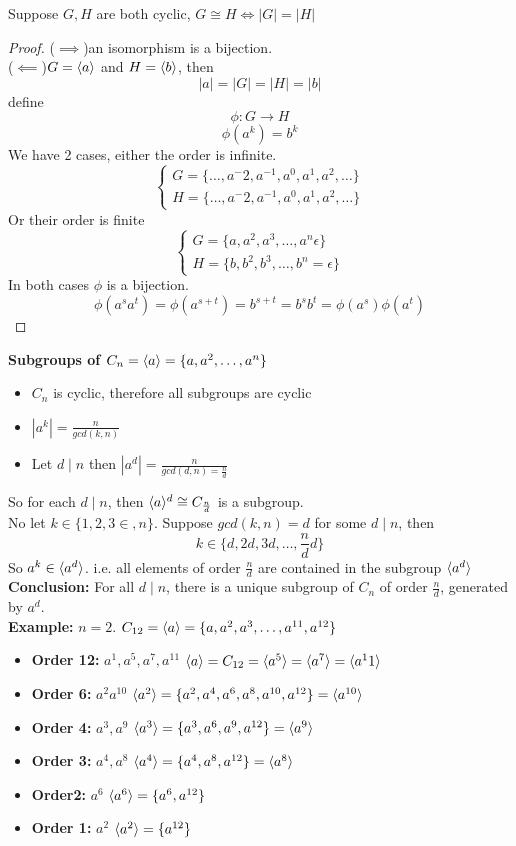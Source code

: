 \documentclass[openany]{report}
\begin{document}
\begin{theorem}
    Suppose $G, H$ are both cyclic, $G \cong H \iff |G| = |H|$
\end{theorem}
\begin{proof}
    ($\implies$)an isomorphism is a bijection.\\[1ex]
    ($\impliedby$)$G = \langle a \rangle$ and $H = \langle b \rangle$, then 
    $$|a| = |G| = |H| = |b|$$
    define 
    $$\phi: G \rightarrow H$$
    $$\phi(a^k) = b^k$$
    We have 2 cases, either the order is infinite.
    $$\begin{cases}
        G = \{\dots, a^-{2}, a^{-1}, a^0, a^1, a^2, \dots\}\\
         H = \{\dots, a^-{2}, a^{-1}, a^0, a^1, a^2, \dots\}
    \end{cases}$$
    Or their order is finite
    $$\begin{cases}
        G = \{a, a^2, a^3, \dots, a^n \epsilon\}\\
        H = \{b, b^2, b^3, \dots, b^n = \epsilon\}
    \end{cases}$$
    In both cases $\phi$ is a bijection.
    \[\phi(a^sa^t) = \phi(a^{s+t})=b^{s+t} = b^sb^t = \phi(a^s)\phi(a^t)\]
\end{proof}
\noindent
\textbf{Subgroups of $C_n = \langle a \rangle = \{a, a^2,\dots, a^n\}$}
\begin{itemize}
    \item $C_n$ is cyclic, therefore all subgroups are cyclic
    \item $|a^k| = \frac{n}{gcd(k,n)}$
    \item Let $d \mid n$ then $|a^d| = \frac{n}{gcd(d,n) = \frac{n}{d}}$
\end{itemize}
So for each $d \mid n$, then $\langle a \rangle^d \cong C_{\frac{n}{d}}$ is a subgroup.\\[1ex]
No let $k \in \{1,2,3\in, n\}$. Suppose $gcd(k,n) = d$ for some $d \mid n$, then 
$$k \in \{d, 2d, 3d, \dots, \frac{n}{d}d\}$$
So $a^k \in \langle a^d \rangle$. i.e. all elements of order $\frac{n}{d}$ are contained in the subgroup $\langle a^d \rangle$\\[2ex]
\textbf{Conclusion:} For all $d \mid n$, there is a unique subgroup of $C_n$ of order $\frac{n}{d}$, generated by $a^d$.\\[3ex]
\textbf{Example:} $n = 2$. $C_{12} = \langle a \rangle = \{a,a^2, a^3, \dots, a^{11}, a^{12}\}$
\begin{itemize}
    \item \textbf{Order 12:} $a^1,a^5,a^7,a^11$ $\langle a \rangle = C_{12} = \langle a^5 \rangle = \langle a^7 \rangle = \langle a^11 \rangle$
     \item \textbf{Order 6:} $a^2a^{10}$ $\langle a^2 \rangle = \{a^2,a^4,a^6,a^8,a^{10},a^{12}\} = \langle a^{10} \rangle$
     \item \textbf{Order 4:} $a^3,a^9$ $\langle a^3 \rangle = \{a^3,a^6, a^9, a^{12}\} = \langle a^9 \rangle$
     \item \textbf{Order 3:} $a^4,a^8$ $\langle a^4 \rangle = \{a^4,a^8, a^{12}\} = \langle a^8 \rangle$
     \item \textbf{Order2:} $a^6$ $\langle a^6 \rangle = \{a^6, a^{12}\}$
     \item \textbf{Order 1:} $a^2$ $\langle a^2 \rangle = \{a^{12}\}$
\end{itemize}
\end{document}
